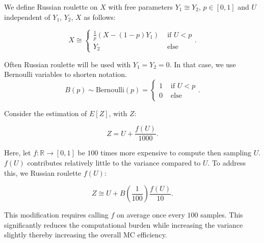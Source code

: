 \documentclass[a4paper,12pt]{article}
\begin{document}
\begin{definition} \label{Russian roulette}
  We define Russian roulette on $X$ with free parameters
  $Y_{1} \cong Y_{2}$, $p \in [0,1]$
  and $U$ independent of $Y_{1}$, $Y_{2}$, $X$
  as follows:

  \begin{equation}
    X \cong
    \begin{cases}
      \frac{1}{p}(X - (1-p)Y_{1}) & \text{ if } U < p \\
      Y_{2}                       & \text{ else }
    \end{cases}.
  \end{equation}
\end{definition}


\begin{notation}[$B(p)$]
  Often Russian roulette will be used with $Y_{1}= Y_{2}= 0$.
  In that case, we use Bernoulli variables to shorten notation.
  \begin{equation}
    B(p) \sim \text{Bernoulli}(p) =
    \begin{cases}
      1 & \text{ if } U<p \\
      0 & \text{ else }
    \end{cases} .
  \end{equation}
\end{notation}

\begin{example} \label{ex:simple russian roulette}
  Consider the estimation of $E[Z]$, with $Z$:

  \begin{equation} \label{eq:simple russian roulette}
    Z = U + \frac{f(U)}{1000}.
  \end{equation}

  Here, let $f:\mathbb{R} \rightarrow [0,1]$ be $100$ times more expensive to compute then sampling $U$.
  $f(U)$ contributes relatively little to the variance compared to $U$. To address this, we Russian roulette $f(U)$:

  \begin{equation}
    Z \cong U + B\left(\frac{1}{100}\right)\frac{f(U)}{10}.
  \end{equation}

  This modification requires calling $f$ on
  average once every $100$ samples. This significantly reduces the
  computational burden while increasing the variance slightly thereby increasing
  the overall MC efficiency.\\
\end{example}
\end{document}
